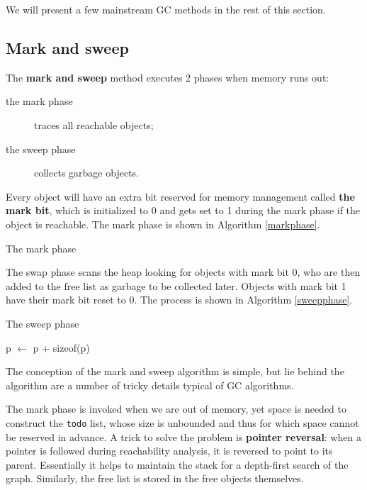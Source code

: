We will present a few mainstream GC methods in the rest of this section.
\subsection{Mark and sweep}
The \textbf{mark and sweep} method executes 2 phases when memory runs out:
\begin{description}
\item[the mark phase]traces all reachable objects;
\item[the sweep phase]collects garbage objects.
\end{description}
Every object will have an extra bit reserved for memory management called \textbf{the mark bit}, which is initialized to 0 and gets set to 1 during the mark phase if the object is reachable. The mark phase is shown in Algorithm \ref{markphase}.
\begin{algorithm}
\caption{The mark phase}\label{markphase}
\begin{algorithmic}
\EndIf
\EndWhile
\end{algorithmic}
\end{algorithm}
The swap phase scans the heap looking for objects with mark bit 0, who are then added to the free list as garbage to be collected later. Objects with mark bit 1 have their mark bit reset to 0. The process is shown in Algorithm \ref{sweepphase}.
\begin{algorithm}
\caption{The sweep phase}\label{sweepphase}
\begin{algorithmic}
\Else{}
\EndIf
p $\leftarrow$ p + sizeof(p)
\EndWhile
\end{algorithmic}
\end{algorithm}
The conception of the mark and sweep algorithm is simple, but lie behind the algorithm are a number of tricky details typical of GC algorithms. 

The mark phase is invoked when we are out of memory, yet space is needed to construct the \texttt{todo} list, whose size is unbounded and thus for which space cannot be reserved in advance. A trick to solve the problem is \textbf{pointer reversal}: when a pointer is followed during reachability analysis, it is reversed to point to its parent. Essentially it helps to maintain the stack for a depth-first search of the graph. Similarly, the free list is stored in the free objects themselves.

